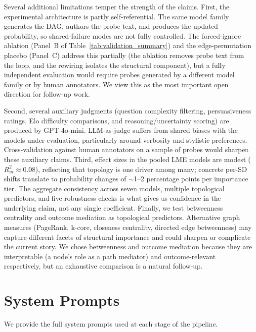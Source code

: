 \documentclass[11pt]{article}
\begin{document}
Several additional limitations temper the strength of the claims. First, the experimental architecture is partly self-referential. The same model family generates the DAG, authors the probe text, and produces the updated probability, so shared-failure modes are not fully controlled. The forced-ignore ablation (Panel~B of Table~\ref{tab:validation_summary}) and the edge-permutation placebo (Panel~C) address this partially (the ablation removes probe text from the loop, and the rewiring isolates the structural component), but a fully independent evaluation would require probes generated by a different model family or by human annotators. We view this as the most important open direction for follow-up work.

Second, several auxiliary judgments (question complexity filtering, persuasiveness ratings, Elo difficulty comparisons, and reasoning/uncertainty scoring) are produced by GPT-4o-mini. LLM-as-judge suffers from shared biases with the models under evaluation, particularly around verbosity and stylistic preferences. Cross-validation against human annotators on a sample of probes would sharpen these auxiliary claims. Third, effect sizes in the pooled LME models are modest ($R^2_m \approx 0.08$), reflecting that topology is one driver among many; concrete per-SD shifts translate to probability changes of $\sim$1--2 percentage points per importance tier. The aggregate consistency across seven models, multiple topological predictors, and five robustness checks is what gives us confidence in the underlying claim, not any single coefficient. Finally, we test betweenness centrality and outcome mediation as topological predictors. Alternative graph measures (PageRank, k-core, closeness centrality, directed edge betweenness) may capture different facets of structural importance and could sharpen or complicate the current story. We chose betweenness and outcome mediation because they are interpretable (a node's role as a path mediator) and outcome-relevant respectively, but an exhaustive comparison is a natural follow-up.

\appendix

\section{System Prompts}
\label{app:prompts}

We provide the full system prompts used at each stage of the pipeline.
\end{document}

